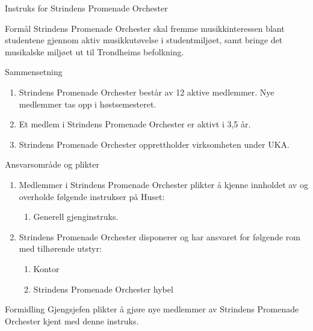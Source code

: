 
\begin{instruks}{Instruks for Strindens Promenade Orchester}{}{}
    \begin{instruksledd}{Formål}
        Strindens Promenade Orchester skal fremme musikkinteressen blant studentene gjennom aktiv
        musikkutøvelse i studentmiljøet, samt bringe det musikalske miljøet ut til Trondheims befolkning.
    \end{instruksledd}

    \begin{instruksledd}{Sammensetning}
        \begin{enumerate}
            \item Strindens Promenade Orchester består av 12 aktive medlemmer. Nye medlemmer tas opp i høstsemesteret.
            \item Et medlem i Strindens Promenade Orchester er aktivt i 3,5 år.
            \item Strindens Promenade Orchester opprettholder virksomheten under UKA.
        \end{enumerate}
    \end{instruksledd}

    \begin{instruksledd}{Ansvarsområde og plikter}
        \begin{enumerate}
            \item Medlemmer i Strindens Promenade Orchester plikter å kjenne innholdet av og overholde følgende instrukser
                på Huset:
                \begin{enumerate}
                    \item Generell gjenginstruks.
                \end{enumerate}
        \item Strindens Promenade Orchester disponerer og har ansvaret for følgende rom med tilhørende utstyr:
            \begin{enumerate}
                \item Kontor
                \item Strindens Promenade Orchester hybel
            \end{enumerate}
        \end{enumerate}
    \end{instruksledd}

    \begin{instruksledd}{Formidling}
        Gjengsjefen plikter å gjøre nye medlemmer av Strindens Promenade Orchester kjent med denne instruks.
    \end{instruksledd}

\end{instruks}

